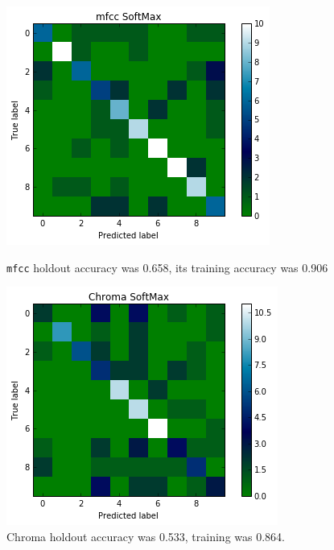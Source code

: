 \documentclass[9pt]{article}
\begin{document}
\begin{figure}[H]
    \centering
    
    \begin{minipage}[b]{0.3\textwidth}
        \includegraphics[width=\textwidth]{softmax-mfcc.png}
        \caption{\texttt{mfcc} holdout accuracy was 0.658, its training accuracy was 0.906}
    \end{minipage}
    \hfill
    \begin{minipage}[b]{0.3\textwidth}
        \includegraphics[width=\textwidth]{softmax-chroma.png}
        \caption{Chroma holdout accuracy was 0.533, training was 0.864.}
    \end{minipage}
    
    \label{fig:softmax}
\end{figure}
\end{document}
